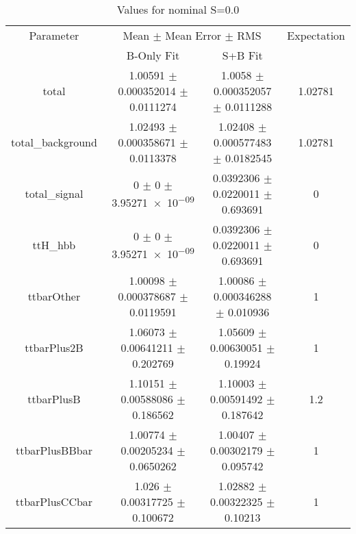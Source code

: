 \begin{table}
\centering
\caption{Values for nominal S=0.0}
\begin{tabular}{cccc}
\toprule
Parameter & \multicolumn{2}{c}{Mean $\pm$ Mean Error $\pm$ RMS} & Expectation\\
 & B-Only Fit & S+B Fit & \\
\midrule
total & \num{1.00591} $\pm$ \num{0.000352014} $\pm$ \num{0.0111274} & \num{1.0058} $\pm$ \num{0.000352057} $\pm$ \num{0.0111288} & \num{1.02781}\\
total\_background & \num{1.02493} $\pm$ \num{0.000358671} $\pm$ \num{0.0113378} & \num{1.02408} $\pm$ \num{0.000577483} $\pm$ \num{0.0182545} & \num{1.02781}\\
total\_signal & \num{0} $\pm$ \num{0} $\pm$ \num{3.95271e-09} & \num{0.0392306} $\pm$ \num{0.0220011} $\pm$ \num{0.693691} & \num{0}\\
ttH\_hbb & \num{0} $\pm$ \num{0} $\pm$ \num{3.95271e-09} & \num{0.0392306} $\pm$ \num{0.0220011} $\pm$ \num{0.693691} & \num{0}\\
ttbarOther & \num{1.00098} $\pm$ \num{0.000378687} $\pm$ \num{0.0119591} & \num{1.00086} $\pm$ \num{0.000346288} $\pm$ \num{0.010936} & \num{1}\\
ttbarPlus2B & \num{1.06073} $\pm$ \num{0.00641211} $\pm$ \num{0.202769} & \num{1.05609} $\pm$ \num{0.00630051} $\pm$ \num{0.19924} & \num{1}\\
ttbarPlusB & \num{1.10151} $\pm$ \num{0.00588086} $\pm$ \num{0.186562} & \num{1.10003} $\pm$ \num{0.00591492} $\pm$ \num{0.187642} & \num{1.2}\\
ttbarPlusBBbar & \num{1.00774} $\pm$ \num{0.00205234} $\pm$ \num{0.0650262} & \num{1.00407} $\pm$ \num{0.00302179} $\pm$ \num{0.095742} & \num{1}\\
ttbarPlusCCbar & \num{1.026} $\pm$ \num{0.00317725} $\pm$ \num{0.100672} & \num{1.02882} $\pm$ \num{0.00322325} $\pm$ \num{0.10213} & \num{1}\\
\bottomrule
\end{tabular}
\end{table}